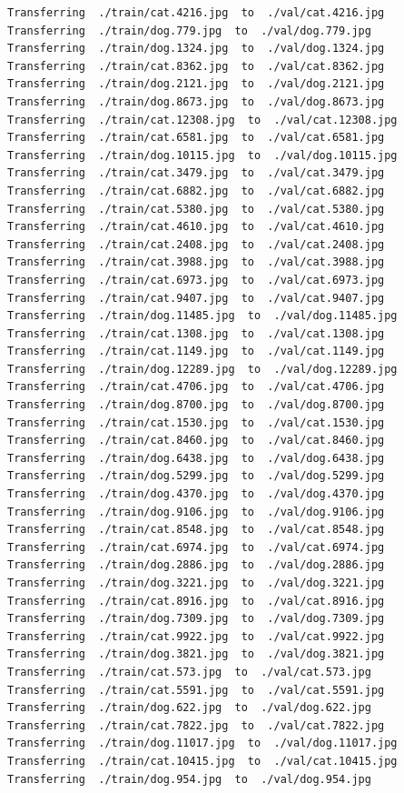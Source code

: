 \documentclass[]{book}
\theoremstyle{definition}
\theoremstyle{definition}
\theoremstyle{definition}
\theoremstyle{remark}
\begin{document}
\begin{verbatim}
Transferring  ./train/cat.4216.jpg  to  ./val/cat.4216.jpg
Transferring  ./train/dog.779.jpg  to  ./val/dog.779.jpg
Transferring  ./train/dog.1324.jpg  to  ./val/dog.1324.jpg
Transferring  ./train/cat.8362.jpg  to  ./val/cat.8362.jpg
Transferring  ./train/dog.2121.jpg  to  ./val/dog.2121.jpg
Transferring  ./train/dog.8673.jpg  to  ./val/dog.8673.jpg
Transferring  ./train/cat.12308.jpg  to  ./val/cat.12308.jpg
Transferring  ./train/cat.6581.jpg  to  ./val/cat.6581.jpg
Transferring  ./train/dog.10115.jpg  to  ./val/dog.10115.jpg
Transferring  ./train/cat.3479.jpg  to  ./val/cat.3479.jpg
Transferring  ./train/cat.6882.jpg  to  ./val/cat.6882.jpg
Transferring  ./train/cat.5380.jpg  to  ./val/cat.5380.jpg
Transferring  ./train/cat.4610.jpg  to  ./val/cat.4610.jpg
Transferring  ./train/cat.2408.jpg  to  ./val/cat.2408.jpg
Transferring  ./train/cat.3988.jpg  to  ./val/cat.3988.jpg
Transferring  ./train/cat.6973.jpg  to  ./val/cat.6973.jpg
Transferring  ./train/cat.9407.jpg  to  ./val/cat.9407.jpg
Transferring  ./train/dog.11485.jpg  to  ./val/dog.11485.jpg
Transferring  ./train/cat.1308.jpg  to  ./val/cat.1308.jpg
Transferring  ./train/cat.1149.jpg  to  ./val/cat.1149.jpg
Transferring  ./train/dog.12289.jpg  to  ./val/dog.12289.jpg
Transferring  ./train/cat.4706.jpg  to  ./val/cat.4706.jpg
Transferring  ./train/dog.8700.jpg  to  ./val/dog.8700.jpg
Transferring  ./train/cat.1530.jpg  to  ./val/cat.1530.jpg
Transferring  ./train/cat.8460.jpg  to  ./val/cat.8460.jpg
Transferring  ./train/dog.6438.jpg  to  ./val/dog.6438.jpg
Transferring  ./train/dog.5299.jpg  to  ./val/dog.5299.jpg
Transferring  ./train/dog.4370.jpg  to  ./val/dog.4370.jpg
Transferring  ./train/dog.9106.jpg  to  ./val/dog.9106.jpg
Transferring  ./train/cat.8548.jpg  to  ./val/cat.8548.jpg
Transferring  ./train/cat.6974.jpg  to  ./val/cat.6974.jpg
Transferring  ./train/dog.2886.jpg  to  ./val/dog.2886.jpg
Transferring  ./train/dog.3221.jpg  to  ./val/dog.3221.jpg
Transferring  ./train/cat.8916.jpg  to  ./val/cat.8916.jpg
Transferring  ./train/dog.7309.jpg  to  ./val/dog.7309.jpg
Transferring  ./train/cat.9922.jpg  to  ./val/cat.9922.jpg
Transferring  ./train/dog.3821.jpg  to  ./val/dog.3821.jpg
Transferring  ./train/cat.573.jpg  to  ./val/cat.573.jpg
Transferring  ./train/cat.5591.jpg  to  ./val/cat.5591.jpg
Transferring  ./train/dog.622.jpg  to  ./val/dog.622.jpg
Transferring  ./train/cat.7822.jpg  to  ./val/cat.7822.jpg
Transferring  ./train/dog.11017.jpg  to  ./val/dog.11017.jpg
Transferring  ./train/cat.10415.jpg  to  ./val/cat.10415.jpg
Transferring  ./train/dog.954.jpg  to  ./val/dog.954.jpg

\end{verbatim}
\end{document}

